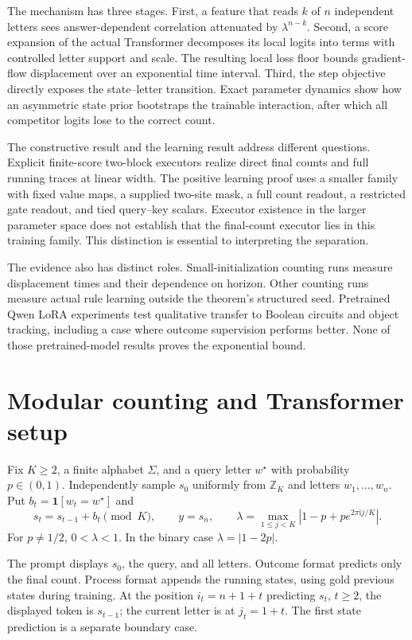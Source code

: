 The mechanism has three stages. First, a feature that reads $k$ of $n$ independent letters sees answer-dependent correlation attenuated by $\lambda^{n-k}$. Second, a score expansion of the actual Transformer decomposes its local logits into terms with controlled letter support and scale. The resulting local loss floor bounds gradient-flow displacement over an exponential time interval. Third, the step objective directly exposes the state--letter transition. Exact parameter dynamics show how an asymmetric state prior bootstraps the trainable interaction, after which all competitor logits lose to the correct count.

The constructive result and the learning result address different questions. Explicit finite-score two-block executors realize direct final counts and full running traces at linear width. The positive learning proof uses a smaller family with fixed value maps, a supplied two-site mask, a full count readout, a restricted gate readout, and tied query--key scalars. Executor existence in the larger parameter space does not establish that the final-count executor lies in this training family. This distinction is essential to interpreting the separation.

The evidence also has distinct roles. Small-initialization counting runs measure displacement times and their dependence on horizon. Other counting runs measure actual rule learning outside the theorem's structured seed. Pretrained Qwen LoRA experiments test qualitative transfer to Boolean circuits and object tracking, including a case where outcome supervision performs better. None of those pretrained-model results proves the exponential bound.

\section{Modular counting and Transformer setup}\label{sec:setup}\label{sec:setting}
\begin{definition}\label{def:task}\label{def:lambda}
Fix $K\ge2$, a finite alphabet $\Sigma$, and a query letter $w^\star$ with probability $p\in(0,1)$. Independently sample $s_0$ uniformly from $\mathbb Z_K$ and letters $w_1,\ldots,w_n$. Put $b_t=\mathbf1[w_t=w^\star]$ and
\begin{equation}
s_t=s_{t-1}+b_t\pmod K,\qquad y=s_n,\qquad
\lambda=\max_{1\le j<K}|1-p+p e^{2\pi\mathrm i j/K}|.
\label{eq:lambda}
\end{equation}
For $p\ne1/2$, $0<\lambda<1$. In the binary case $\lambda=|1-2p|$.
\end{definition}
The prompt displays $s_0$, the query, and all letters. Outcome format predicts only the final count. Process format appends the running states, using gold previous states during training. At the position $i_t=n+1+t$ predicting $s_t$, $t\ge2$, the displayed token is $s_{t-1}$; the current letter is at $j_t=1+t$. The first state prediction is a separate boundary case.

